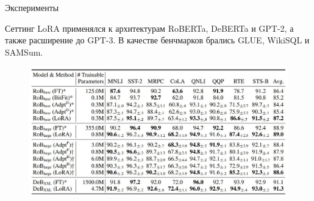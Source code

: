 \documentclass[9pt]{beamer}
\begin{document}
\begin{frame}{Эксперименты}

    \begin{block}{Сеттинг}
        LoRA применялся к архитектурам RoBERTa, DeBERTa и GPT-2, а также расширение до GPT-3. В качестве бенчмарков брались GLUE, WikiSQL и SAMSum.
    \end{block}

    \begin{figure}
        \begin{center}
            \includegraphics[scale=0.34]{images/lora_3.jpg}
        \end{center}
    \end{figure}

\end{frame}
\end{document}
